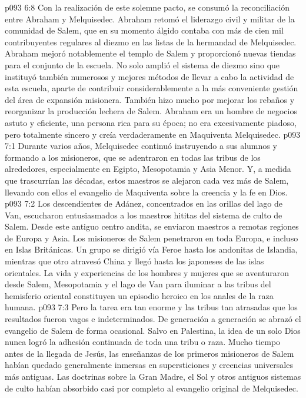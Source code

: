 \vs p093 6:8 Con la realización de este solemne pacto, se consumó la reconciliación entre Abraham y Melquisedec. Abraham retomó el liderazgo civil y militar de la comunidad de Salem, que en su momento álgido contaba con más de cien mil contribuyentes regulares al diezmo en las listas de la hermandad de Melquisedec. Abraham mejoró notablemente el templo de Salem y proporcionó nuevas tiendas para el conjunto de la escuela. No solo amplió el sistema de diezmo sino que instituyó también numerosos y mejores métodos de llevar a cabo la actividad de esta escuela, aparte de contribuir considerablemente a la más conveniente gestión del área de expansión misionera. También hizo mucho por mejorar los rebaños y reorganizar la producción lechera de Salem. Abraham era un hombre de negocios astuto y eficiente, una persona rica para su época; no era excesivamente piadoso, pero totalmente sincero y creía verdaderamente en Maquiventa Melquisedec.
\vs p093 7:1 Durante varios años, Melquisedec continuó instruyendo a sus alumnos y formando a los misioneros, que se adentraron en todas las tribus de los alrededores, especialmente en Egipto, Mesopotamia y Asia Menor. Y, a medida que trascurrían las décadas, estos maestros se alejaron cada vez más de Salem, llevando con ellos el evangelio de Maquiventa sobre la creencia y la fe en Dios.
\vs p093 7:2 Los descendientes de Adánez, concentrados en las orillas del lago de Van, escucharon entusiasmados a los maestros hititas del sistema de culto de Salem. Desde este antiguo centro andita, se enviaron maestros a remotas regiones de Europa y Asia. Los misioneros de Salem penetraron en toda Europa, e incluso en Islas Británicas. Un grupo se dirigió vía Feroe hasta los andonitas de Islandia, mientras que otro atravesó China y llegó hasta los japoneses de las islas orientales. La vida y experiencias de los hombres y mujeres que se aventuraron desde Salem, Mesopotamia y el lago de Van para iluminar a las tribus del hemisferio oriental constituyen un episodio heroico en los anales de la raza humana.
\vs p093 7:3 Pero la tarea era tan enorme y las tribus tan atrasadas que los resultados fueron vagos e indeterminados. De generación a generación se abrazó el evangelio de Salem de forma ocasional. Salvo en Palestina, la idea de un solo Dios nunca logró la adhesión continuada de toda una tribu o raza. Mucho tiempo antes de la llegada de Jesús, las enseñanzas de los primeros misioneros de Salem habían quedado generalmente inmersas en supersticiones y creencias universales más antiguas. Las doctrinas sobre la Gran Madre, el Sol y otros antiguos sistemas de culto habían absorbido casi por completo al evangelio original de Melquisedec.
